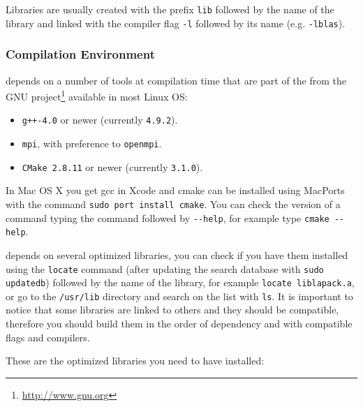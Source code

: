 Libraries are usually created with the prefix \verb!lib! followed by the name of the library
and linked with the compiler flag \verb!-l! followed by its name (e.g. \verb!-lblas!).

\subsubsection{Compilation Environment}
\label{sec:comp-envir}

\lifev depends on a number of tools at compilation time that are part
of the  from the GNU project\footnote{\url{http://www.gnu.org}}
available in most Linux OS:

\begin{itemize}
\item \verb!g++-4.0! or newer (currently \verb!4.9.2!).
\item \verb!mpi!, with preference to \verb!openmpi!.
\item \verb!CMake 2.8.11! or newer (currently \verb!3.1.0!).
\end{itemize}

In Mac OS X you get gcc in Xcode and cmake can be installed using MacPorts with the command \verb!sudo port install cmake!. You can check the version of a command typing the command followed by \verb!--help!,
for example type \verb!cmake --help!.

\lifev depends on several optimized libraries, you can check if you have them installed
using the \verb!locate! command (after updating the search database with \verb!sudo updatedb!) followed by the name of the library, for example
\verb!locate liblapack.a!, or go to the \verb!/usr/lib! directory and search on the
list with \verb!ls!.
It is important to notice that some libraries are linked to others and they should
be compatible, therefore you should build them in the order of dependency and with
compatible flags and compilers.

These are the optimized libraries you need to have installed:

